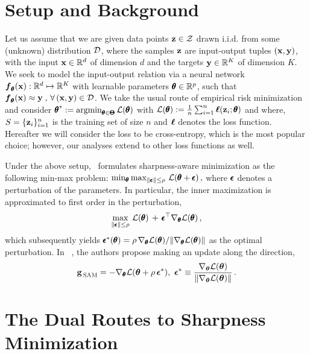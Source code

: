 \section{Setup and Background}


Let us assume that we are given data points $\mathbf z\in\mathcal{Z}$ drawn i.i.d. from some (unknown) distribution ${\mathcal{D}}$, where the samples $\mathbf z$ are input-output tuples $(\mathbf x, \mathbf y)$, with the input $\mathbf x \in \mathbb{R}^d$ of dimension $d$ and the targets $\mathbf y \in \mathbb{R}^K$ of dimension $K$. We seek to model the input-output relation via a neural network $\boldsymbol{f}_{\pmb \theta}(\mathbf x) :\mathbb{R}^d \mapsto \mathbb{R}^K$ with learnable parameters ${\pmb \theta}\in\mathbb{R}^p$, such that $\boldsymbol{f}_{\pmb \theta}(\mathbf x) \approx \mathbf y \;, \, \forall \, (\mathbf x, \mathbf y) \in {\mathcal{D}}$. We take the usual route of empirical risk minimization~\citep{vapnik1991principles} and consider ${\pmb \theta}^\ast:=\operatorname*{argmin}_{{\pmb \theta}\in{\pmb \Theta}} {\mathcal{L}}({\pmb \theta})$ with ${\mathcal{L}}({\pmb \theta}) := \frac{1}{n} \sum_{i=1}^{n} \boldsymbol\ell(\mathbf z_i; {\pmb \theta})$ and where, $S=\lbrace\mathbf z_i\rbrace_{i=1}^n$ is the training set of size $n$ and $\boldsymbol\ell$ denotes the loss function. Hereafter we will consider the loss to be cross-entropy, which is the most popular choice; however, our analyses extend to other loss functions as well.  


Under the above setup,~\citet{foret2020sharpness} formulates sharpness-aware minimization as the following min-max problem:
$\min_{\pmb \theta} \max_{\|{\pmb \epsilon}\| \leq \rho} \, {\mathcal{L}}({\pmb \theta} + {\pmb \epsilon})\,,$ where ${\pmb \epsilon}$ denotes a perturbation of the parameters. In particular, the inner maximization is approximated to first order in the perturbation, 
\begin{align}\label{eq:sam}
\vspace{-2mm}
\max_{\|\beps\| \leq \rho} \, \Loss(\btheta) \,+\, \beps^\top \nabla_\btheta \Loss(\btheta)\,,
\end{align}
which subsequently yields ${\pmb \epsilon}^\ast({\pmb \theta}) = \rho\,{ \nabla_{\pmb \theta} {\mathcal{L}}({\pmb \theta})}/{\|\nabla_{\pmb \theta} {\mathcal{L}}({\pmb \theta})\|} $  as the optimal perturbation. In \SAM~\citep{foret2020sharpness}, the authors propose making an update along the direction,
\begin{equation}\label{eq:sam-update}
{\boldsymbol{\mathbf{g}}}_{\, {\textcolor{black}{\textsc{SAM}}}} = -\nabla_{\pmb \theta}{\mathcal{L}}({\boldsymbol{\mathbf{\theta}}}+\rho\, {\boldsymbol{\mathbf{\epsilon}}}^*),~{\boldsymbol{\mathbf{\epsilon}}}^*\equiv \frac{\nabla_{{\boldsymbol{\mathbf{\theta}}}}{\mathcal{L}}({\boldsymbol{\mathbf{\theta}}})}{\|\nabla_{{\boldsymbol{\mathbf{\theta}}}}{\mathcal{L}}({\boldsymbol{\mathbf{\theta}}}) \|}\,.
\end{equation}

\section{The Dual Routes to Sharpness Minimization}\label{sec:sharpness-paths}

